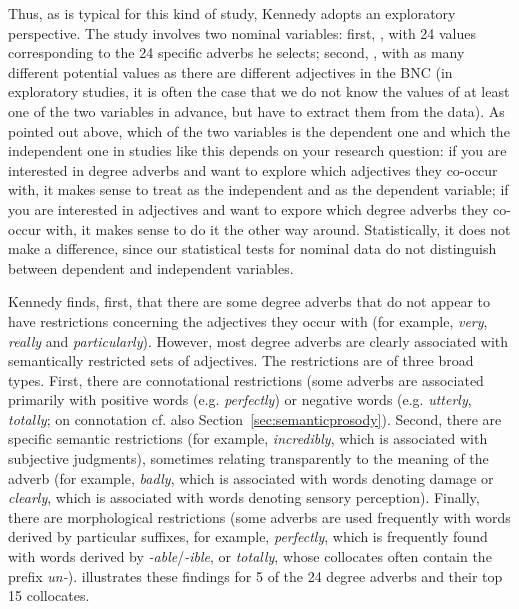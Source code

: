 Thus, as is typical for this kind of study, Kennedy adopts an exploratory perspective. The study involves two nominal  variables: first, ,  with 24 values corresponding to the 24 specific adverbs  he selects; second, , with as many different potential values as there are different adjectives  in the BNC  (in exploratory  studies, it is often the case that we do not know the values of at least one of the two variables in advance, but have to extract  them from the data). As pointed out above, which of the two variables is the dependent one and which the independent one in studies like this depends on your research question: if you are interested in degree adverbs  and want to explore which adjectives  they co\hyp{}occur with, it makes sense to treat  as the independent and  as the dependent variable; if you are interested in adjectives  and want to expore which degree adverbs  they co\hyp{}occur with, it makes sense to do it the other way around. Statistically, it does not make a difference, since our statistical tests for nominal  data do not distinguish between dependent and independent variables.

Kennedy finds, first, that there are some degree adverbs  that do not appear to have restrictions concerning the adjectives  they occur with (for example, \textit{very}, \textit{really} and \textit{particularly}). However, most degree adverbs  are clearly associated  with semantically  restricted sets of adjectives.  The restrictions are of three broad types. First, there are connotational  restrictions (some adverbs  are associated  primarily with positive words (e.g. \textit{perfectly}) or negative words (e.g. \textit{utterly}, \textit{totally}; on connotation  cf. also Section~\ref{sec:semanticprosody}). Second, there are specific semantic restrictions (for example, \textit{incredibly}, which is associated  with subjective judgments), sometimes relating transparently to the meaning of the adverb  (for example, \textit{badly}, which is associated with words denoting damage or \textit{clearly}, which is associated  with words denoting sensory perception). Finally, there are morphological  restrictions (some adverbs  are used frequently with words derived by particular suffixes,  for example, \textit{perfectly}, which is frequently found with words derived by \textit{-able}\slash \textit{-ible}, or \textit{totally}, whose collocates  often contain the prefix  \textit{un-}).  illustrates these findings for 5 of the 24 degree adverbs  and their top 15 collocates.

